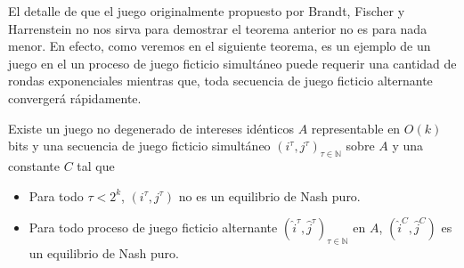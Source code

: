 El detalle de que el juego originalmente propuesto por Brandt, Fischer y Harrenstein no nos sirva para demostrar el teorema anterior no es para nada menor. En efecto, como veremos en el siguiente teorema, es un ejemplo de un juego en el un proceso de juego ficticio simultáneo puede requerir una cantidad de rondas exponenciales mientras que, toda secuencia de juego ficticio alternante convergerá rápidamente.

\begin{theorem} \label{teorema:afp:mejor}
    Existe un juego no degenerado de intereses idénticos $A$ representable en $O(k)$ bits y una secuencia de juego ficticio simultáneo $(i^\tau, j^\tau)_{\tau \in \mathbb{N}}$ sobre $A$ y una constante $C$ tal que
    \begin{itemize}
        \item Para todo $\tau < 2^k$, $(i^\tau, j^\tau)$ no es un equilibrio de Nash puro.
        \item Para todo proceso de juego ficticio alternante $(\widehat{i}^\tau, \widehat{j}^\tau)_{\tau \in \mathbb{N}}$ en $A$, $(\widehat{i}^C, \widehat{j}^C)$ es un equilibrio de Nash puro.
    \end{itemize}
\end{theorem}


